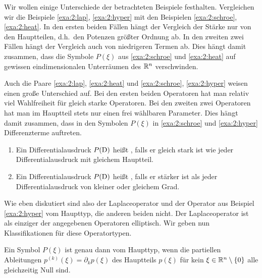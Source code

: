Wir wollen einige Unterschiede der betrachteten Beispiele festhalten.
Vergleichen wir die Beispiele \ref{exa:2:lap}, \ref{exa:2:hyper}
mit den Beispielen \ref{exa:2:schroe}, \ref{exa:2:heat}.
In den ersten beiden Fällen hängt der Vergleich der Stärke nur von den Hauptteilen,
d.h.~den Potenzen größter Ordnung ab.
In den zweiten zwei Fällen hängt der Vergleich auch von niedrigeren Termen ab.
Dies hängt damit zusammen, dass die Symbole $P(\xi)$ aus
\ref{exa:2:schroe} und \ref{exa:2:heat}
auf gewissen eindimensionalen Unterräumen des $\mathbb R^n$ verschwinden.

Auch die Paare \ref{exa:2:lap}, \ref{exa:2:heat}
und \ref{exa:2:schroe}, \ref{exa:2:hyper}
weisen einen große Unterschied auf.
Bei den ersten beiden Operatoren hat man relativ viel Wahlfreiheit
für gleich starke Operatoren.
Bei den zweiten zwei Operatoren hat man im Hauptteil stets
nur einen frei wählbaren Parameter.
Dies hängt damit zusammen, dass in den Symbolen $P(\xi)$
in \ref{exa:2:schroe} und \ref{exa:2:hyper} Differenzterme auftreten.

\begin{df}
\begin{enumerate}
\item
Ein Differentialausdruck $P(\mathrm D)$ heißt ,
falls er gleich stark ist wie jeder Differentialausdruck mit gleichem Hauptteil.
\item
Ein Differentialausdruck $P(\mathrm D)$ heißt ,
falls er stärker ist als jeder Differentialausdruck von kleiner oder gleichem Grad.
\end{enumerate}
\end{df}

Wie eben diskutiert sind also der Laplaceoperator
und der Operator aus Beispiel \ref{exa:2:hyper} vom Haupttyp,
die anderen beiden nicht. Der Laplaceoperator
ist als einziger der angegebenen Operatoren elliptisch.
Wir geben nun Klassifikationen für diese Operatortypen.

\begin{thm}\label{thm:2:2.9}
Ein Symbol $P(\xi)$ ist genau dann vom Haupttyp,
wenn die partiellen Ableitungen $p^{(k)}(\xi)=\partial_k p(\xi)$
des Hauptteils $p(\xi)$ für kein $\xi\in\mathbb R^n\setminus\{0\}$
alle gleichzeitig Null sind.
\end{thm}

